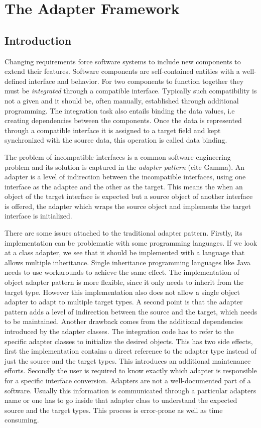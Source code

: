 \chapter{The Adapter Framework}

\section{Introduction}

Changing requirements force software systems to include new components to extend their features. 
Software components are self-contained entities with a well-defined interface and behavior. 
For two components to function together they must be \emph{integrated} through a compatible interface. 
Typically such compatibility is not a given and it should be, often manually, established through additional programming. 
The integration task also entails binding the data values, i.e creating dependencies between the components. 
Once the data is represented through a compatible interface it is assigned to a target field and kept synchronized with the source data, this operation is called data binding.

The problem of incompatible interfaces is a common software engineering problem and its solution is captured in the \emph{adapter pattern} (cite Gamma). 
An adapter is a level of indirection between the incompatible interfaces, using one interface as the adaptee and the other as the target.  
This means the when an object of the target interface is expected but a source object of another interface is offered, the adapter which wraps the source object and implements the target interface is initialized. 

There are some issues attached to the traditional adapter pattern.
Firstly, its implementation can be problematic with some programming languages.
If we look at a class adapter, we see that it should be implemented with a language that allows multiple inheritance. 
Single inheritance programming languages like Java needs to use workarounds to achieve the same effect.
The implementation of object adapter pattern is more flexible, since it only needs to inherit from the target type. 
However this implementation also does not allow a single object adapter to adapt to multiple target types. 
A second point is that the adapter pattern adds a level of indirection between the source and the target, which needs to be maintained. 
Another drawback comes from the additional dependencies introduced by the adapter classes. 
The integration code has to refer to the specific adapter classes to initialize the desired objects. 
This has two side effects, first the implementation contains a direct reference to the adapter type instead of just the source and the target types. This introduces an additional maintenance efforts. 
Secondly the user is required to know exactly which adapter is responsible for a specific interface conversion.
Adapters are not a well-documented part of  a software.
Usually this information is communicated through a particular adapters name or one has to go inside that adapter class to understand the expected source and the target types. 
This process is error-prone as well as time consuming.

